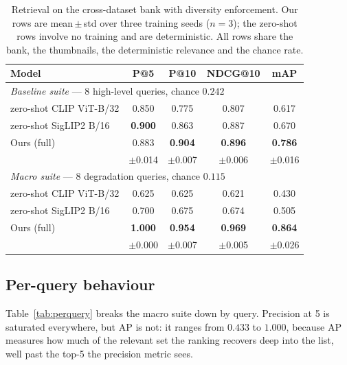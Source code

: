 \documentclass[10pt,twocolumn,letterpaper]{article}
\begin{document}
\begin{table}[t]\centering\footnotesize
\setlength{\tabcolsep}{3pt}
\begin{tabular}{lcccc}
\toprule
Model & P@5 & P@10 & NDCG@10 & mAP \\
\midrule
\multicolumn{5}{l}{\emph{Baseline suite} --- 8 high-level queries, chance $0.242$} \\
\quad zero-shot CLIP ViT-B/32   & 0.850 & 0.775 & 0.807 & 0.617 \\
\quad zero-shot SigLIP2 B/16    & \textbf{0.900} & 0.863 & 0.887 & 0.670 \\
\quad Ours (full)               & 0.883 & \textbf{0.904} & \textbf{0.896} & \textbf{0.786} \\
\quad                           & {\scriptsize$\pm$0.014} & {\scriptsize$\pm$0.007} & {\scriptsize$\pm$0.006} & {\scriptsize$\pm$0.016} \\
\midrule
\multicolumn{5}{l}{\emph{Macro suite} --- 8 degradation queries, chance $0.115$} \\
\quad zero-shot CLIP ViT-B/32   & 0.625 & 0.625 & 0.621 & 0.430 \\
\quad zero-shot SigLIP2 B/16    & 0.700 & 0.675 & 0.674 & 0.505 \\
\quad Ours (full)               & \textbf{1.000} & \textbf{0.954} & \textbf{0.969} & \textbf{0.864} \\
\quad                           & {\scriptsize$\pm$0.000} & {\scriptsize$\pm$0.007} & {\scriptsize$\pm$0.005} & {\scriptsize$\pm$0.026} \\
\bottomrule
\end{tabular}
\caption{Retrieval on the cross-dataset bank with diversity enforcement.
Our rows are mean\,$\pm$\,std over three training seeds ($n{=}3$); the
zero-shot rows involve no training and are deterministic. All rows share the
bank, the thumbnails, the deterministic relevance and the chance rate.}
\label{tab:main}
\end{table}


\subsection{Per-query behaviour}
Table~\ref{tab:perquery} breaks the macro suite down by query. Precision at
5 is saturated everywhere, but AP is not: it ranges from $0.433$ to $1.000$,
because AP measures how much of the relevant set the ranking recovers deep
into the list, well past the top-5 the precision metric sees.
\end{document}
